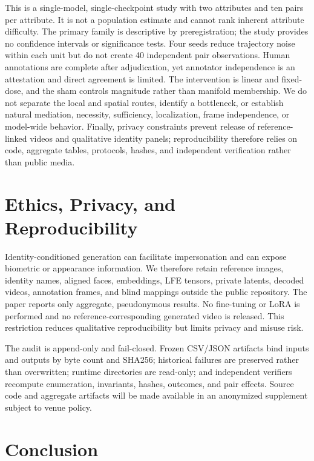 \documentclass[10pt,twocolumn,letterpaper]{article}
\begin{document}
This is a single-model, single-checkpoint study with two attributes and ten pairs per attribute.  It is not a population estimate and cannot rank inherent attribute difficulty.  The primary family is descriptive by preregistration; the study provides no confidence intervals or significance tests.  Four seeds reduce trajectory noise within each unit but do not create 40 independent pair observations.  Human annotations are complete after adjudication, yet annotator independence is an attestation and direct agreement is limited.  The intervention is linear and fixed-dose, and the sham controls magnitude rather than manifold membership.  We do not separate the local and spatial routes, identify a bottleneck, or establish natural mediation, necessity, sufficiency, localization, frame independence, or model-wide behavior.  Finally, privacy constraints prevent release of reference-linked videos and qualitative identity panels; reproducibility therefore relies on code, aggregate tables, protocols, hashes, and independent verification rather than public media.

\section{Ethics, Privacy, and Reproducibility}
\label{sec:ethics}

Identity-conditioned generation can facilitate impersonation and can expose biometric or appearance information.  We therefore retain reference images, identity names, aligned faces, embeddings, LFE tensors, private latents, decoded videos, annotation frames, and blind mappings outside the public repository.  The paper reports only aggregate, pseudonymous results.  No fine-tuning or LoRA is performed and no reference-corresponding generated video is released.  This restriction reduces qualitative reproducibility but limits privacy and misuse risk.

The audit is append-only and fail-closed.  Frozen CSV/JSON artifacts bind inputs and outputs by byte count and SHA256; historical failures are preserved rather than overwritten; runtime directories are read-only; and independent verifiers recompute enumeration, invariants, hashes, outcomes, and pair effects.  Source code and aggregate artifacts will be made available in an anonymized supplement subject to venue policy.

\section{Conclusion}
\end{document}
